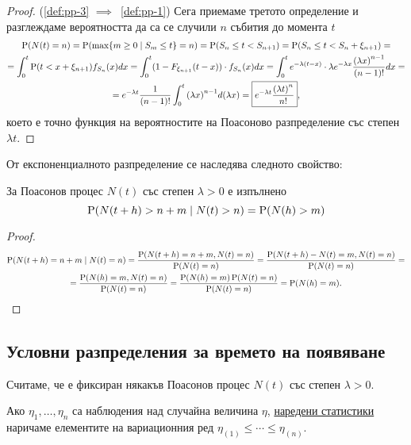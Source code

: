 \documentclass[numbers=endperiod, DIV=15, bibliography=totocnumbered]{scrartcl}
\begin{document}
\begin{proof}
  (\ref{def:pp-3} $\implies$~\ref{def:pp-1}) Сега приемаме третото определение и разглеждаме вероятността да са се случили $n$ събития до момента $t$
  \begin{multline*}
    \operatorname{P}(N(t) = n)
    =
    \operatorname{P}(\max \{ m \geq 0 \mid S_m \leq t \} = n)
    =
    \operatorname{P}(S_n \leq t < S_{n+1})
    =
    \operatorname{P}(S_n \leq t < S_n + \xi_{n+1})
    = \\ =
    \int_0^t \operatorname{P}(t < x + \xi_{n+1}) f_{S_n} (x) dx
    =
    \int_0^t (1 - F_{\xi_{n+1}} (t - x)) \cdot f_{S_n} (x) dx
    =
    \int_0^t e^{-\lambda (t-x)} \cdot \lambda e^{-\lambda x} \frac {{(\lambda x)}^{n-1}} {(n-1)!} dx
    = \\ =
    e^{-\lambda t} \frac 1 {(n-1)!} \int_0^t {(\lambda x)}^{n-1} d(\lambda x)
    =
    \boxed{e^{-\lambda t} \frac {{(\lambda t)}^n} {n!}},
  \end{multline*}
  което е точно функция на вероятностите на Поасоново разпределение със степен $\lambda t$.
\end{proof}

От експоненциалното разпределение се наследява следното свойство:
\begin{proposition}
  За Поасонов процес $N(t)$ със степен $\lambda > 0$ е изпълнено
  \begin{displaymath}
    \operatorname{P}(N(t+h) > n + m \mid N(t) > n)
    =
    \operatorname{P}(N(h) > m)
  \end{displaymath}
\end{proposition}
\begin{proof}
  \begin{multline*}
    \operatorname{P}(N(t+h) = n + m \mid N(t) = n)
    =
    \frac {\operatorname{P}(N(t+h) = n + m, N(t) = n)} {\operatorname{P}(N(t) = n)}
    =
    \frac {\operatorname{P}(N(t+h) - N(t) = m, N(t) = n)} {\operatorname{P}(N(t) = n)}
    = \\ =
    \frac {\operatorname{P}(N(h) = m, N(t) = n)} {\operatorname{P}(N(t) = n)}
    =
    \frac {\operatorname{P}(N(h) = m) \operatorname{P}(N(t) = n)} {\operatorname{P}(N(t) = n)}
    =
    \operatorname{P}(N(h) = m).
  \end{multline*}
\end{proof}

\subsection{Условни разпределения за времето на появяване}

Считаме, че е фиксиран някакъв Поасонов процес $N(t)$ със степен $\lambda > 0$.

\begin{definition}
  Ако $\eta_1, \ldots, \eta_n$ са наблюдения над случайна величина $\eta$, \uline{наредени статистики} наричаме елементите на вариационния ред $\eta_{(1)} \leq \cdots \leq \eta_{(n)}$.
\end{definition}
\end{document}
